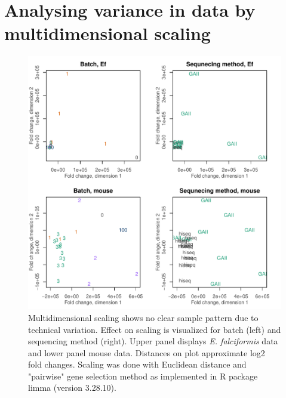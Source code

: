 \documentclass{article}
\begin{document}
\section{Analysing variance in data by multidimensional scaling}
\begin{figure}[H]
\begin{center}
	\includegraphics[width=\textwidth]{EfMm_4-mds.pdf} %
	\caption{Multidimensional scaling shows no clear sample pattern due to technical variation. Effect on scaling is visualized for batch (left) and sequencing method (right). Upper panel displays \textit{E. falciformis} data and lower panel mouse data. Distances on plot approximate log2 fold changes. Scaling was done with Euclidean distance and "pairwise" gene selection method as implemented in R package limma (version 3.28.10).}
\end{center}
\end{figure}
\end{document}
